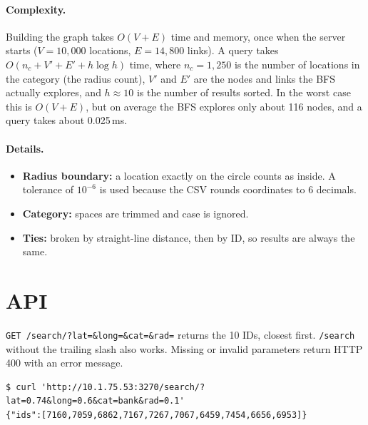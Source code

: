 \documentclass[11pt,a4paper]{article}
\begin{document}
\paragraph{Complexity.} Building the graph takes $O(V + E)$ time and memory, once when the server starts
($V = 10{,}000$ locations, $E = 14{,}800$ links). A query takes $O(n_c + V' + E' + h\log h)$ time, where
$n_c = 1{,}250$ is the number of locations in the category (the radius count), $V'$ and $E'$ are the nodes
and links the BFS actually explores, and $h \approx 10$ is the number of results sorted. In the worst case
this is $O(V + E)$, but on average the BFS explores only about 116 nodes, and a query takes about 0.025\,ms.

\paragraph{Details.}
\begin{itemize}
  \item \textbf{Radius boundary:} a location exactly on the circle counts as inside. A tolerance of
        $10^{-6}$ is used because the CSV rounds coordinates to 6 decimals.
  \item \textbf{Category:} spaces are trimmed and case is ignored.
  \item \textbf{Ties:} broken by straight-line distance, then by ID, so results are always the same.
\end{itemize}

\noindent\begin{minipage}{\linewidth}

\end{minipage}

\section{API}

\texttt{GET /search/?lat=\&long=\&cat=\&rad=} returns the 10 IDs, closest first. \texttt{/search} without
the trailing slash also works. Missing or invalid parameters return HTTP 400 with an error message.

\begin{lstlisting}[language={}, numbers=none]
$ curl 'http://10.1.75.53:3270/search/?lat=0.74&long=0.6&cat=bank&rad=0.1'
{"ids":[7160,7059,6862,7167,7267,7067,6459,7454,6656,6953]}
\end{lstlisting}
\end{document}

